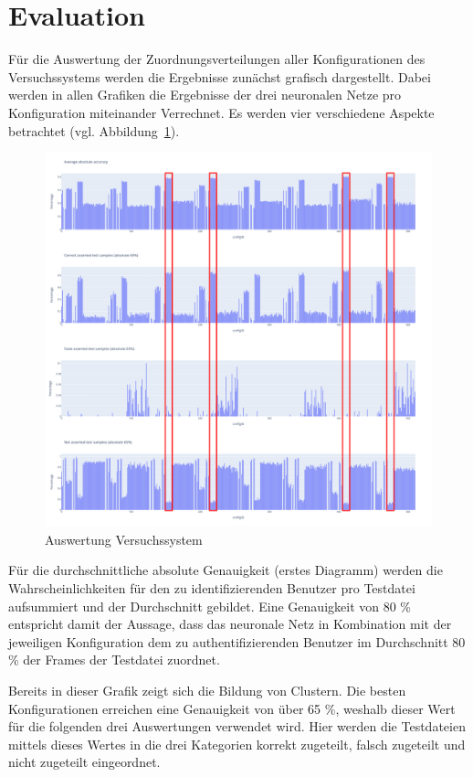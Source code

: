 \section{Evaluation} \label{sec:Evaluation}
Für die Auswertung der Zuordnungsverteilungen aller Konfigurationen des Versuchssystems werden die Ergebnisse zunächst grafisch dargestellt.
Dabei werden in allen Grafiken die Ergebnisse der drei neuronalen Netze pro Konfiguration miteinander Verrechnet.
Es werden vier verschiedene Aspekte betrachtet (vgl. Abbildung~\ref{fig:AuswertungVersuchssystem}).
\begin{figure}[H]
    \centering
    \includegraphics[width=1\textwidth, keepaspectratio]{images/Auswertung.png}
    \caption{Auswertung Versuchssystem}
    \label{fig:AuswertungVersuchssystem}
\end{figure}

Für die durchschnittliche absolute Genauigkeit (erstes Diagramm) werden die Wahrscheinlichkeiten für den zu identifizierenden Benutzer pro Testdatei aufsummiert und der Durchschnitt gebildet.
Eine Genauigkeit von 80 \% entspricht damit der Aussage, dass das neuronale Netz in Kombination mit der jeweiligen Konfiguration dem zu authentifizierenden Benutzer im Durchschnitt 80 \% der Frames der Testdatei zuordnet.

Bereits in dieser Grafik zeigt sich die Bildung von Clustern.
Die besten Konfigurationen erreichen eine Genauigkeit von über 65 \%, weshalb dieser Wert für die folgenden drei Auswertungen verwendet wird.
Hier werden die Testdateien mittels dieses Wertes in die drei Kategorien korrekt zugeteilt, falsch zugeteilt und nicht zugeteilt eingeordnet.

